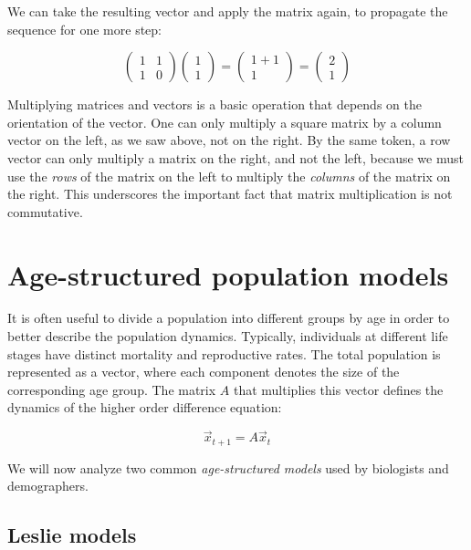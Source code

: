 \documentclass[
  letterpaper,
  DIV=11,
  numbers=noendperiod]{scrreprt}
\begin{document}
We can take the resulting vector and apply the matrix again, to
propagate the sequence for one more step:

\[
\left(\begin{array}{cc}1 & 1\\1 & 0\end{array}\right)\left(\begin{array}{c}1\\ 1\end{array}\right) = \left(\begin{array}{c}1+ 1 \\ 1 \end{array}\right)  = \left(\begin{array}{c}2 \\ 1 \end{array}\right)
\]

Multiplying matrices and vectors is a basic operation that depends on
the orientation of the vector. One can only multiply a square matrix by
a column vector on the left, as we saw above, not on the right. By the
same token, a row vector can only multiply a matrix on the right, and
not the left, because we must use the \emph{rows} of the matrix on the
left to multiply the \emph{columns} of the matrix on the right. This
underscores the important fact that matrix multiplication is not
commutative.

\hypertarget{age-structured-population-models}{%
\section{Age-structured population
models}\label{age-structured-population-models}}

It is often useful to divide a population into different groups by age
in order to better describe the population dynamics. Typically,
individuals at different life stages have distinct mortality and
reproductive rates. The total population is represented as a vector,
where each component denotes the size of the corresponding age group.
The matrix \(A\) that multiplies this vector defines the dynamics of the
higher order difference equation:

\[
\vec x_{t+1} = A \vec x_t
\]

We will now analyze two common \emph{age-structured models} used by
biologists and demographers.

\hypertarget{leslie-models}{%
\subsection{Leslie models}\label{leslie-models}}
\end{document}
